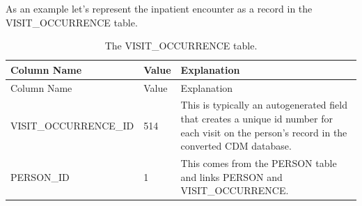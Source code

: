 \documentclass[11pt]{book}
\begin{document}
As an example let's represent the inpatient encounter as a record in the
VISIT\_OCCURRENCE table.

\begin{longtable}[]{@{}lll@{}}
\caption{\label{tab:visitOccurrence} The VISIT\_OCCURRENCE
table.}\tabularnewline
\toprule
\begin{minipage}[b]{0.27\columnwidth}\raggedright\strut
Column Name\strut
\end{minipage} & \begin{minipage}[b]{0.15\columnwidth}\raggedright\strut
Value\strut
\end{minipage} & \begin{minipage}[b]{0.49\columnwidth}\raggedright\strut
Explanation\strut
\end{minipage}\tabularnewline
\midrule
\endfirsthead
\toprule
\begin{minipage}[b]{0.27\columnwidth}\raggedright\strut
Column Name\strut
\end{minipage} & \begin{minipage}[b]{0.15\columnwidth}\raggedright\strut
Value\strut
\end{minipage} & \begin{minipage}[b]{0.49\columnwidth}\raggedright\strut
Explanation\strut
\end{minipage}\tabularnewline
\midrule
\endhead
\begin{minipage}[t]{0.27\columnwidth}\raggedright\strut
VISIT\_OCCURRENCE\_ID\strut
\end{minipage} & \begin{minipage}[t]{0.15\columnwidth}\raggedright\strut
514\strut
\end{minipage} & \begin{minipage}[t]{0.49\columnwidth}\raggedright\strut
This is typically an autogenerated field that creates a unique id number
for each visit on the person's record in the converted CDM
database.\strut
\end{minipage}\tabularnewline
\begin{minipage}[t]{0.27\columnwidth}\raggedright\strut
PERSON\_ID\strut
\end{minipage} & \begin{minipage}[t]{0.15\columnwidth}\raggedright\strut
1\strut
\end{minipage} & \begin{minipage}[t]{0.49\columnwidth}\raggedright\strut
This comes from the PERSON table and links PERSON and
VISIT\_OCCURRENCE.\strut
\end{minipage}\tabularnewline

\end{longtable}
\end{document}
